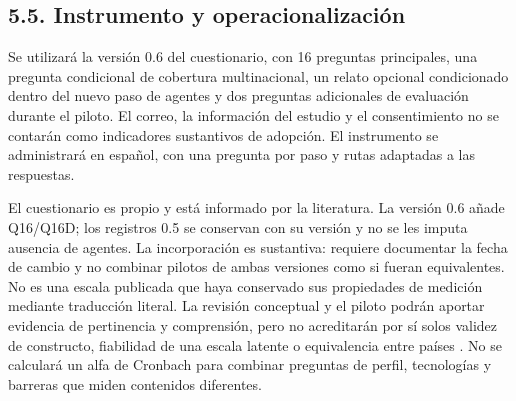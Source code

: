 \documentclass[12pt,letterpaper]{article}
\begin{document}
\subsection*{5.5. Instrumento y operacionalización}
Se utilizará la versión 0.6 del cuestionario, con 16 preguntas principales, una pregunta condicional de cobertura multinacional, un relato opcional condicionado dentro del nuevo paso de agentes y dos preguntas adicionales de evaluación durante el piloto. El correo, la información del estudio y el consentimiento no se contarán como indicadores sustantivos de adopción. El instrumento se administrará en español, con una pregunta por paso y rutas adaptadas a las respuestas.

El cuestionario es propio y está informado por la literatura. La versión 0.6 añade Q16/Q16D; los registros 0.5 se conservan con su versión y no se les imputa ausencia de agentes. La incorporación es sustantiva: requiere documentar la fecha de cambio y no combinar pilotos de ambas versiones como si fueran equivalentes. No es una escala publicada que haya conservado sus propiedades de medición mediante traducción literal. La revisión conceptual y el piloto podrán aportar evidencia de pertinencia y comprensión, pero no acreditarán por sí solos validez de constructo, fiabilidad de una escala latente o equivalencia entre países \citep{boateng}. No se calculará un alfa de Cronbach para combinar preguntas de perfil, tecnologías y barreras que miden contenidos diferentes.
\end{document}
